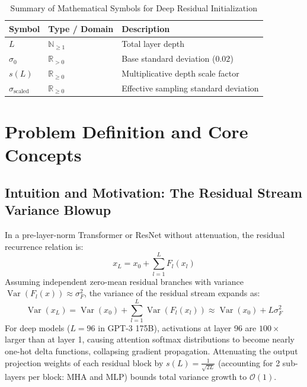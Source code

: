 \documentclass[11pt,a4paper]{article}
\theoremstyle{definition}
\begin{document}
\begin{table}[h]
\centering
\caption{Summary of Mathematical Symbols for Deep Residual Initialization}
\begin{tabular}{lll}
\toprule
\textbf{Symbol} & \textbf{Type / Domain} & \textbf{Description} \\
\midrule
$L$ & $\mathbb{N}_{\ge 1}$ & Total layer depth \\
$\sigma_0$ & $\mathbb{R}_{> 0}$ & Base standard deviation ($0.02$) \\
$s(L)$ & $\mathbb{R}_{\ge 0}$ & Multiplicative depth scale factor \\
$\sigma_{\text{scaled}}$ & $\mathbb{R}_{\ge 0}$ & Effective sampling standard deviation \\
\bottomrule
\end{tabular}
\end{table}

\section{Problem Definition and Core Concepts}

\subsection{Intuition and Motivation: The Residual Stream Variance Blowup}
In a pre-layer-norm Transformer or ResNet without attenuation, the residual recurrence relation is:
\begin{equation}
x_L = x_0 + \sum_{l=1}^L F_l(x_l)
\end{equation}
Assuming independent zero-mean residual branches with variance $\operatorname{Var}(F_l(x)) \approx \sigma_F^2$, the variance of the residual stream expands as:
\begin{equation}
\operatorname{Var}(x_L) = \operatorname{Var}(x_0) + \sum_{l=1}^L \operatorname{Var}(F_l(x_l)) \approx \operatorname{Var}(x_0) + L \sigma_F^2
\end{equation}
For deep models ($L = 96$ in GPT-3 175B), activations at layer 96 are $100\times$ larger than at layer 1, causing attention softmax distributions to become nearly one-hot delta functions, collapsing gradient propagation. Attenuating the output projection weights of each residual block by $s(L) = \frac{1}{\sqrt{2L}}$ (accounting for 2 sub-layers per block: MHA and MLP) bounds total variance growth to $\mathcal{O}(1)$.
\end{document}
